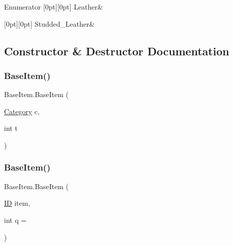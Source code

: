 \begin{DoxyEnumFields}{Enumerator}
[0pt][0pt]{}\mbox{\label{class_base_item_a920c9e47e5258c5bac64842ce8997cb0abdf7ad23e89b55f904bca0304819309e}} 
Leather&\\
\hline

[0pt][0pt]{}\mbox{\label{class_base_item_a920c9e47e5258c5bac64842ce8997cb0a34833b9352f8ebeef7960b067a6ee001}} 
Studded\+\_\+\+Leather&\\
\hline

\end{DoxyEnumFields}


\subsection{Constructor \& Destructor Documentation}
\mbox{\label{class_base_item_a77ce3304ad35c5fdb9ed807beac19a66}} 
\subsubsection{\texorpdfstring{BaseItem()}{BaseItem()}\hspace{0.1cm}{\footnotesize\ttfamily [1/2]}}
{\footnotesize\ttfamily Base\+Item.\+Base\+Item (\begin{DoxyParamCaption}\item[{\mbox{\hyperlink{class_base_item_a882a2962396f880c2e23755437245d37}{Category}}}]{c,  }\item[{int}]{t }\end{DoxyParamCaption})}

\mbox{\label{class_base_item_a4faa2410aa193b87718cc3ed337c0766}} 
\subsubsection{\texorpdfstring{BaseItem()}{BaseItem()}\hspace{0.1cm}{\footnotesize\ttfamily [2/2]}}
{\footnotesize\ttfamily Base\+Item.\+Base\+Item (\begin{DoxyParamCaption}\item[{\mbox{\hyperlink{class_base_item_add9920d2f5a4fa91752714a8f3ab424b}{ID}}}]{item,  }\item[{int}]{q = {} }\end{DoxyParamCaption})}

